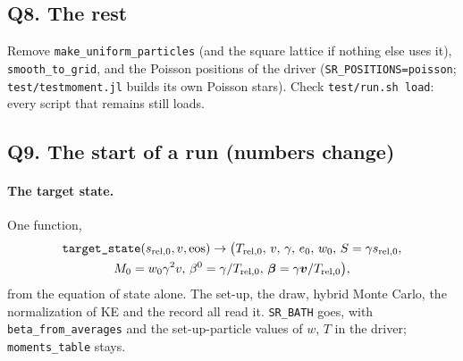 \documentclass[11pt,aps,preprint,nofootinbib,superscriptaddress,tightenlines]{revtex4-2}
\let\oldparagraph\paragraph
\renewcommand{\paragraph}{\par\bigskip\oldparagraph}
\begin{document}
\subsection*{Q8. The rest}
Remove \texttt{make\_uniform\_particles} (and the square lattice if nothing else uses it), \texttt{smooth\_to\_grid}, and the Poisson positions
of the driver (\texttt{SR\_POSITIONS=poisson}; \nolinkurl{test/testmoment.jl} builds its own Poisson stars).  Check \nolinkurl{test/run.sh load}:
every script that remains still loads.

\subsection*{Q9. The start of a run (numbers change)}
\label{sec:q9}

\paragraph{The target state.}  One function,
\begin{multline}
\texttt{target\_state}(s_{\rm rel,0}, v, \text{eos}) \to \big(T_{\rm rel,0},\, v,\, \gamma,\, e_0,\, w_0,\, S=\gamma s_{\rm rel,0},\\
M_0=w_0\gamma^2 v,\, \beta^0=\gamma/T_{\rm rel,0},\, \bm\beta=\gamma\bm v/T_{\rm rel,0}\big),
\end{multline}
from the equation of state alone.  The set-up, the draw, hybrid Monte Carlo, the normalization of KE and the record all read it.
\texttt{SR\_BATH} goes, with \texttt{beta\_from\_averages} and the set-up-particle values of $w$, $T$ in the driver; \texttt{moments\_table}
stays.
\end{document}
